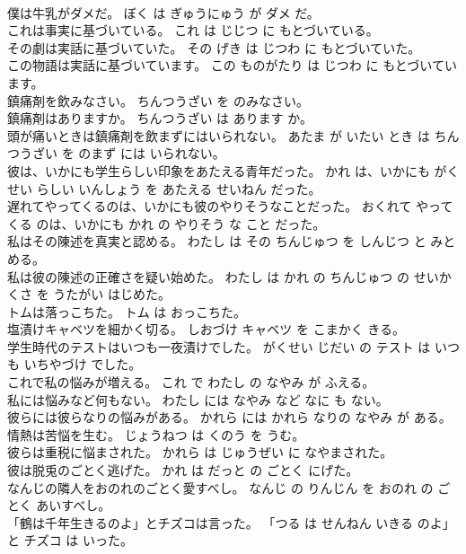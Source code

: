 \documentclass[8pt]{extreport}
\begin{document}
\begin{CJK}{UTF8}{min}
\\	僕は牛乳がダメだ。	ぼく は ぎゅうにゅう が ダメ だ。	
\\	これは事実に基づいている。	これ は じじつ に もとづいている。	
\\	その劇は実話に基づいていた。	その げき は じつわ に もとづいていた。	
\\	この物語は実話に基づいています。	この ものがたり は じつわ に もとづいています。	
\\	鎮痛剤を飲みなさい。	ちんつうざい を のみなさい。	
\\	鎮痛剤はありますか。	ちんつうざい は あります か。	
\\	頭が痛いときは鎮痛剤を飲まずにはいられない。	あたま が いたい とき は ちんつうざい を のまず には いられない。	
\\	彼は、いかにも学生らしい印象をあたえる青年だった。	かれ は、いかにも がくせい らしい いんしょう を あたえる せいねん だった。	
\\	遅れてやってくるのは、いかにも彼のやりそうなことだった。	おくれて やって くる のは、いかにも かれ の やりそう な こと だった。	
\\	私はその陳述を真実と認める。	わたし は その ちんじゅつ を しんじつ と みとめる。	
\\	私は彼の陳述の正確さを疑い始めた。	わたし は かれ の ちんじゅつ の せいかくさ を うたがい はじめた。	
\\	トムは落っこちた。	トム は おっこちた。	
\\	塩漬けキャベツを細かく切る。	しおづけ キャベツ を こまかく きる。	
\\	学生時代のテストはいつも一夜漬けでした。	がくせい じだい の テスト は いつも いちやづけ でした。	
\\	これで私の悩みが増える。	これ で わたし の なやみ が ふえる。	
\\	私には悩みなど何もない。	わたし には なやみ など なに も ない。	
\\	彼らには彼らなりの悩みがある。	かれら には かれら なりの なやみ が ある。	
\\	情熱は苦悩を生む。	じょうねつ は くのう を うむ。	
\\	彼らは重税に悩まされた。	かれら は じゅうぜい に なやまされた。	
\\	彼は脱兎のごとく逃げた。	かれ は だっと の ごとく にげた。	
\\	なんじの隣人をおのれのごとく愛すべし。	なんじ の りんじん を おのれ の ごとく あいすべし。	
\\	「鶴は千年生きるのよ」とチズコは言った。	「つる は せんねん いきる のよ」と チズコ は いった。	

\end{CJK}
\end{document}
